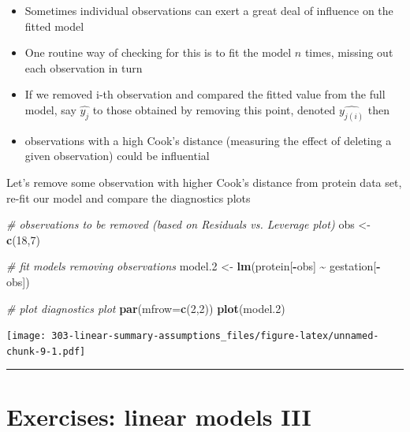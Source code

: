 \documentclass[
]{book}
\newenvironment{Shaded}{\begin{snugshade}}{\end{snugshade}}
\newcommand{\CommentTok}[1]{\textcolor[rgb]{0.56,0.35,0.01}{\textit{#1}}}
\newcommand{\DataTypeTok}[1]{\textcolor[rgb]{0.13,0.29,0.53}{#1}}
\newcommand{\DecValTok}[1]{\textcolor[rgb]{0.00,0.00,0.81}{#1}}
\newcommand{\FloatTok}[1]{\textcolor[rgb]{0.00,0.00,0.81}{#1}}
\newcommand{\KeywordTok}[1]{\textcolor[rgb]{0.13,0.29,0.53}{\textbf{#1}}}
\newcommand{\NormalTok}[1]{#1}
\newcommand{\OperatorTok}[1]{\textcolor[rgb]{0.81,0.36,0.00}{\textbf{#1}}}
\newcommand{\StringTok}[1]{\textcolor[rgb]{0.31,0.60,0.02}{#1}}
\providecommand{\tightlist}{%
  \setlength{\itemsep}{0pt}\setlength{\parskip}{0pt}}
\theoremstyle{definition}
\theoremstyle{definition}
\theoremstyle{definition}
\theoremstyle{remark}
\begin{document}
\begin{itemize}
\tightlist
\item
  Sometimes individual observations can exert a great deal of influence on the fitted model
\item
  One routine way of checking for this is to fit the model \(n\) times, missing out each observation in turn
\item
  If we removed i-th observation and compared the fitted value from the full model, say \(\hat{y_j}\) to those obtained by removing this point, denoted \(\hat{y_{j(i)}}\) then
\item
  observations with a high Cook's distance (measuring the effect of deleting a given observation) could be influential
\end{itemize}

Let's remove some observation with higher Cook's distance from protein data set, re-fit our model and compare the diagnostics plots

\begin{Shaded}
\begin{Highlighting}[]
\CommentTok{\# observations to be removed (based on Residuals vs. Leverage plot)}
\NormalTok{obs \textless{}{-}}\StringTok{ }\KeywordTok{c}\NormalTok{(}\DecValTok{18}\NormalTok{,}\DecValTok{7}\NormalTok{)}

\CommentTok{\# fit models removing observations}
\NormalTok{model}\FloatTok{.2}\NormalTok{ \textless{}{-}}\StringTok{ }\KeywordTok{lm}\NormalTok{(protein[}\OperatorTok{{-}}\NormalTok{obs] }\OperatorTok{\textasciitilde{}}\StringTok{ }\NormalTok{gestation[}\OperatorTok{{-}}\NormalTok{obs])}

\CommentTok{\# plot diagnostics plot}
\KeywordTok{par}\NormalTok{(}\DataTypeTok{mfrow=}\KeywordTok{c}\NormalTok{(}\DecValTok{2}\NormalTok{,}\DecValTok{2}\NormalTok{))}
\KeywordTok{plot}\NormalTok{(model}\FloatTok{.2}\NormalTok{)}
\end{Highlighting}
\end{Shaded}

\texttt{[image: 303-linear-summary-assumptions\_files/figure-latex/unnamed-chunk-9-1.pdf]}

\begin{center}\rule{0.5\linewidth}{0.5pt}\end{center}

\hypertarget{exercises-linear-models-iii}{%
\section{Exercises: linear models III}\label{exercises-linear-models-iii}}
\end{document}
